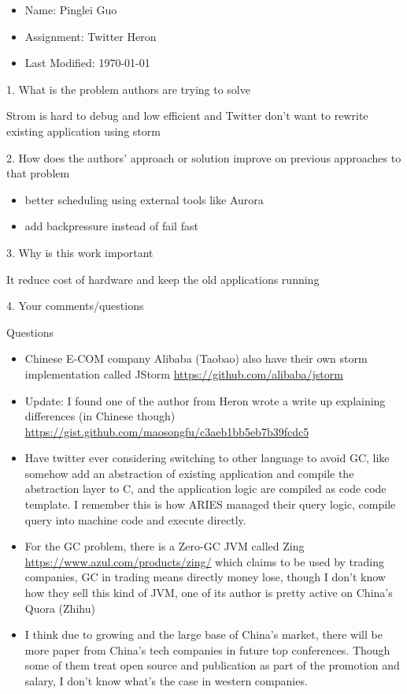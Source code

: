 \documentclass[12pt,a4paper,oneside]{article}
\begin{document}
\begin{itemize}
  \item Name: Pinglei Guo
  \item Assignment: Twitter Heron
  \item Last Modified: \today
\end{itemize}

1. What is the problem authors are trying to solve

\medskip

Strom is hard to debug and low efficient and Twitter don't want to rewrite existing application using storm

\bigskip

2. How does the authors’ approach or solution improve on previous approaches to that problem

\medskip

\begin{itemize}
  \item better scheduling using external tools like Aurora
  \item add backpressure instead of fail fast
\end{itemize}

\bigskip

3. Why is this work important

\medskip

It reduce cost of hardware and keep the old applications running

\bigskip

4. Your comments/questions

\medskip

Questions

\begin{itemize}
  \item Chinese E-COM company Alibaba (Taobao) also have their own storm implementation called JStorm \url{https://github.com/alibaba/jstorm}
  \item Update: I found one of the author from Heron wrote a write up explaining differences (in Chinese though) \url{https://gist.github.com/maosongfu/c3aeb1bb5eb7b39fcdc5}
  \item Have twitter ever considering switching to other language to avoid GC, like somehow add an abstraction of existing application and
  compile the abstraction layer to C, and the application logic are compiled as code code template. I remember this is how ARIES managed their
  query logic, compile query into machine code and execute directly.
  \item For the GC problem, there is a Zero-GC JVM called Zing \url{https://www.azul.com/products/zing/} which claims to be used by trading companies,
  GC in trading means directly money lose, though I don't know how they sell this kind of JVM, one of its author is pretty active on China's Quora (Zhihu)
  \item I think due to growing and the large base of China's market, there will be more paper from China's tech companies in future top conferences.
  Though some of them treat open source and publication as part of the promotion and salary, I don't know what's the case in western companies.
\end{itemize}
\end{document}
